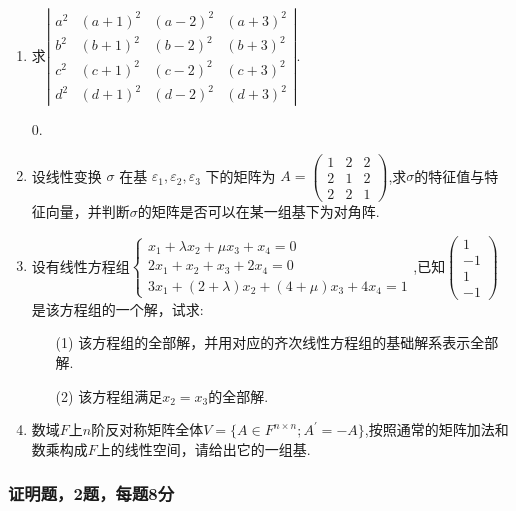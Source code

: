 \begin{enumerate}
    \item 求$\left|\begin{array}{llll}a^2 & (a+1)^2 & (a-2)^2 & (a+3)^2 \\ b^2 & (b+1)^2 & (b-2)^2 & (b+3)^2 \\ c^2 & (c+1)^2 & (c-2)^2 & (c+3)^2 \\ d^2 & (d+1)^2 & (d-2)^2 & (d+3)^2\end{array}\right|$.
    \begin{solution}
        0.
    \end{solution}
    \item 设线性变换 $\sigma$ 在基 $\varepsilon_1, \varepsilon_2 , \varepsilon_3$ 下的矩阵为 $A=\left(\begin{array}{ccc}1 & 2 & 2 \\ 2 & 1 & 2 \\ 2 & 2 & 1\end{array}\right)$,求$\sigma $的特征值与特征向量，并判断$\sigma $的矩阵是否可以在某一组基下为对角阵.
    \item 设有线性方程组$\begin{cases}
        x_1+\lambda x_2+\mu x_3+x_4=0\\ 2x_1+x_2+x_3+2x_4=0 \\ 3x_1+(2+\lambda)x_2+(4+\mu) x_3+ 4x_4=1
    \end{cases}$,已知$\begin{pmatrix}
        1\\-1\\1\\-1
    \end{pmatrix}$是该方程组的一个解，试求:
    \begin{enumerate}
        \item[(1)] 该方程组的全部解，并用对应的齐次线性方程组的基础解系表示全部解.\\
        \item[(2)] 该方程组满足$x_2=x_3$的全部解.
    \end{enumerate}
    \item 数域$F$上$n$阶反对称矩阵全体$V=\{A\in F^{n \times n};A^\prime=-A\}$,按照通常的矩阵加法和数乘构成$F$上的线性空间，请给出它的一组基.
\end{enumerate}

\subsubsection*{证明题，2题，每题8分}

